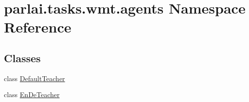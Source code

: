 \hypertarget{namespaceparlai_1_1tasks_1_1wmt_1_1agents}{}\section{parlai.\+tasks.\+wmt.\+agents Namespace Reference}
\label{namespaceparlai_1_1tasks_1_1wmt_1_1agents}
\subsection*{Classes}
\begin{DoxyCompactItemize}
\item 
class \hyperlink{classparlai_1_1tasks_1_1wmt_1_1agents_1_1DefaultTeacher}{Default\+Teacher}
\item 
class \hyperlink{classparlai_1_1tasks_1_1wmt_1_1agents_1_1EnDeTeacher}{En\+De\+Teacher}
\end{DoxyCompactItemize}
